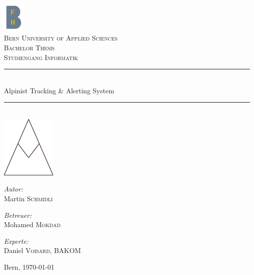 \documentclass[11pt,english,german]{report}
\theoremstyle{definition}
\begin{document}
\pagestyle{empty} %
\begin{titlepage}
\begin{center}

\includegraphics[width=0.08\textwidth]{img/bfh_logo.png}\\[1cm]    
\textsc{\LARGE Bern University of Applied Sciences}\\[1.5cm]
\textsc{\Large Bachelor Thesis}\\[0.2cm]
\textsc{\Large Studiengang Informatik}\\[0.5cm]

\newcommand{\HRule}{\rule{\linewidth}{0.3mm}}
\HRule \\[0.4cm]
{\huge Alpinist Tracking \& Alerting System}\\[0.3cm]
{\huge \bfseries  }
\HRule \\[2cm]

\includegraphics[width=0.2\textwidth]{img/atas_logo.png}\\[2.5cm]    

\begin{minipage}{0.3\textwidth}
\begin{flushleft} \large
\emph{Autor:}\\
Martin \textsc{Schmidli}\\
\end{flushleft}
\end{minipage}
\hfill
\begin{minipage}{0.3\textwidth}
\begin{flushleft} \large
\emph{Betreuer:} \\
Mohamed \textsc{Mokdad}
\end{flushleft}
\end{minipage}
\hfill
\begin{minipage}{0.38\textwidth}
\begin{flushleft} \large
\emph{Experte:}\\
Daniel \textsc{Voisard}, BAKOM\\
\end{flushleft}
\end{minipage}

\vspace{20mm}

Bern, {\large \today}
\end{center}
\end{titlepage}
\pagestyle{fancy}
\end{document}
